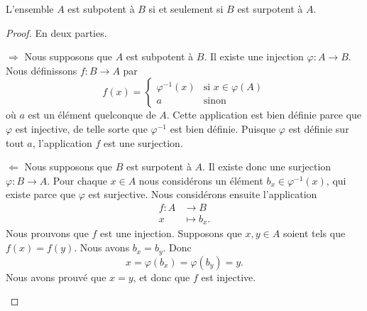 \begin{proposition}      \label{PROPooWSXTooMQPcNG}
    L'ensemble \( A\) est subpotent à \( B\) si et seulement si \( B\) est surpotent à \( A\).
\end{proposition}

\begin{proof}
    En deux parties.
    \begin{subproof}
        \item[\( \Rightarrow\)]
            Nous supposons que \( A\) est subpotent à \( B\). Il existe une injection \( \varphi\colon A\to B\). Nous définissons \( f\colon B\to A\) par
            \begin{equation}
                f(x)=\begin{cases}
                    \varphi^{-1}(x)    &   \text{si } x\in\varphi(A)\\
                    a    &    \text{sinon } 
                \end{cases}
            \end{equation}
            où \( a\) est un élément quelconque de \( A\). Cette application est bien définie parce que \( \varphi\) est injective, de telle sorte que \( \varphi^{-1}\) est bien définie. Puisque \( \varphi\) est définie sur tout \( a\), l'application \( f\) est une surjection.
        \item[\( \Leftarrow\)]
            Nous supposons que \( B\) est surpotent à \( A\). Il existe donc une surjection \( \varphi\colon B\to A\). Pour chaque \( x\in A\) nous considérons un élément \( b_x\in \varphi^{-1}(x)\), qui existe parce que \( \varphi\) est surjective. Nous considérons ensuite l'application
            \begin{equation}
                \begin{aligned}
                    f\colon A&\to B \\
                    x&\mapsto b_x. 
                \end{aligned}
            \end{equation}
            Nous prouvons que \( f\) est une injection. Supposons que \( x,y\in A\) soient tels que \( f(x)=f(y)\). Nous avons \( b_x=b_y\). Donc
            \begin{equation}
                x=\varphi(b_x)=\varphi(b_y)=y.
            \end{equation}
            Nous avons prouvé que \( x=y\), et donc que \( f\) est injective.
    \end{subproof}
\end{proof}

